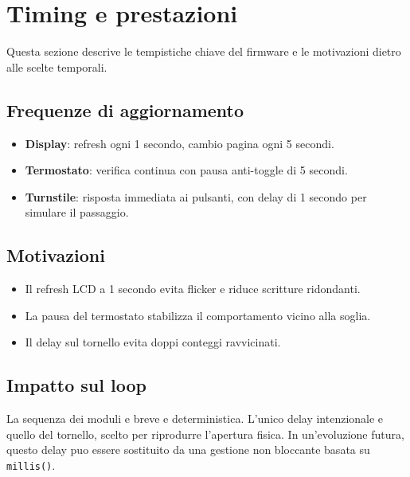 \chapter{Timing e prestazioni}

Questa sezione descrive le tempistiche chiave del firmware e le motivazioni dietro alle scelte temporali.

\section{Frequenze di aggiornamento}
\begin{itemize}
  \item \textbf{Display}: refresh ogni 1 secondo, cambio pagina ogni 5 secondi.
  \item \textbf{Termostato}: verifica continua con pausa anti-toggle di 5 secondi.
  \item \textbf{Turnstile}: risposta immediata ai pulsanti, con delay di 1 secondo per simulare il passaggio.
\end{itemize}

\section{Motivazioni}
\begin{itemize}
  \item Il refresh LCD a 1 secondo evita flicker e riduce scritture ridondanti.
  \item La pausa del termostato stabilizza il comportamento vicino alla soglia.
  \item Il delay sul tornello evita doppi conteggi ravvicinati.
\end{itemize}

\section{Impatto sul loop}
La sequenza dei moduli e breve e deterministica. L'unico delay intenzionale e quello del tornello, scelto per riprodurre l'apertura fisica. In un'evoluzione futura, questo delay puo essere sostituito da una gestione non bloccante basata su \texttt{millis()}.
